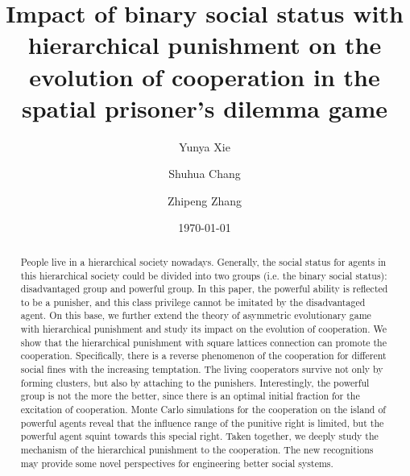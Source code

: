 \documentclass[%
 aip,
 amsmath,amssymb,
 reprint,%
]{revtex4-1}
\begin{document}

\title{Impact of binary social status with hierarchical punishment on the evolution of cooperation in the spatial prisoner's dilemma game}

\author{Yunya Xie}
\author{Shuhua Chang}%


\author{Zhipeng Zhang}

%

\date{\today}%

\begin{abstract}
People live in a hierarchical society nowadays. Generally, the social status for agents in this hierarchical society could be divided into two groups (i.e. the binary social status): disadvantaged group and powerful group. In this paper, the powerful ability is reflected to be a punisher, and this class privilege cannot be imitated by the disadvantaged agent. On this base, we further extend the theory of asymmetric evolutionary game with hierarchical punishment and study its impact on the evolution of cooperation. We show that the hierarchical punishment with square lattices connection can promote the cooperation. Specifically, there is a reverse phenomenon of the cooperation for different social fines with the increasing temptation. The living cooperators survive not only by forming clusters, but also by attaching to the punishers. Interestingly, the powerful group is not the more the better, since there is an optimal initial fraction for the excitation of cooperation. Monte Carlo simulations for the cooperation on the island of powerful agents reveal that the influence range of the punitive right is limited, but the powerful agent squint towards this special right. Taken together, we deeply study the mechanism of the hierarchical punishment to the cooperation. The new recognitions may provide some novel perspectives for engineering better social systems.
\end{abstract}
\end{document}

